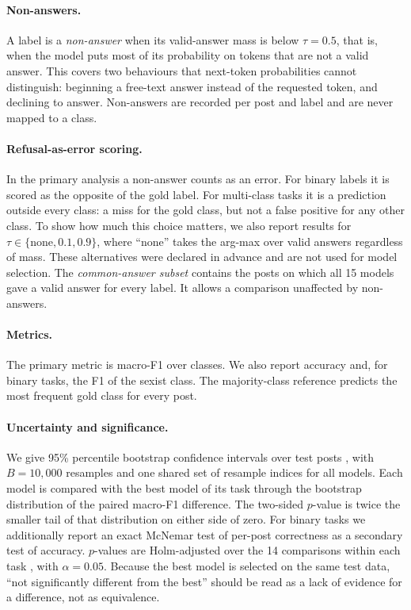 \documentclass[11pt]{article}
\begin{document}
\paragraph{Non-answers.} A label is a \emph{non-answer} when its valid-answer mass is below $\tau = 0.5$, that is, when the model puts most of its probability on tokens that are not a valid answer. This covers two behaviours that next-token probabilities cannot distinguish: beginning a free-text answer instead of the requested token, and declining to answer. Non-answers are recorded per post and label and are never mapped to a class.

\paragraph{Refusal-as-error scoring.} In the primary analysis a non-answer counts as an error. For binary labels it is scored as the opposite of the gold label. For multi-class tasks it is a prediction outside every class: a miss for the gold class, but not a false positive for any other class. To show how much this choice matters, we also report results for $\tau \in \{\text{none}, 0.1, 0.9\}$, where ``none'' takes the arg-max over valid answers regardless of mass. These alternatives were declared in advance and are not used for model selection. The \emph{common-answer subset} contains the posts on which all 15 models gave a valid answer for every label. It allows a comparison unaffected by non-answers.

\paragraph{Metrics.} The primary metric is macro-F1 over classes. We also report accuracy and, for binary tasks, the F1 of the sexist class. The majority-class reference predicts the most frequent gold class for every post.

\paragraph{Uncertainty and significance.} We give 95\% percentile bootstrap confidence intervals over test posts \citep{efron1993bootstrap}, with $B = 10{,}000$ resamples and one shared set of resample indices for all models. Each model is compared with the best model of its task through the bootstrap distribution of the paired macro-F1 difference. The two-sided $p$-value is twice the smaller tail of that distribution on either side of zero. For binary tasks we additionally report an exact McNemar test of per-post correctness \citep{mcnemar1947} as a secondary test of accuracy. $p$-values are Holm-adjusted over the 14 comparisons within each task \citep{holm1979}, with $\alpha = 0.05$. Because the best model is selected on the same test data, ``not significantly different from the best'' should be read as a lack of evidence for a difference, not as equivalence.
\end{document}
